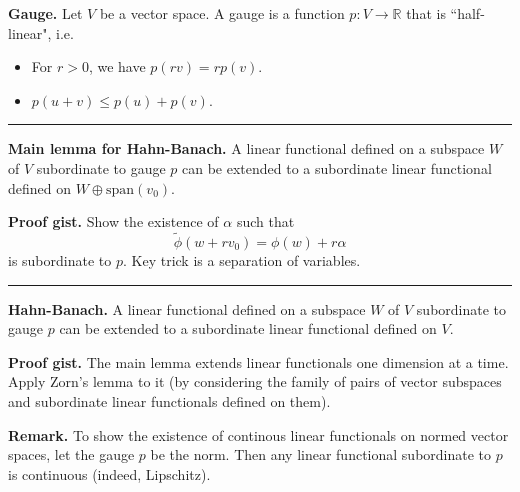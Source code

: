 \documentclass[12pt, letterpaper]{article}
\newcommand{\bR}{{\mathbb R}}
\begin{document}
\pagestyle{fancy}
\textbf{Gauge.} Let $V$ be a vector space. A gauge is a function $p: V \rightarrow \bR$ that is ``half-linear", i.e.
\begin{itemize}
\item
For $r > 0$, we have $p(rv) = rp(v)$.
\item
$p(u + v) \leq p(u) + p(v)$.
\end{itemize}

\noindent\rule{\textwidth}{1pt}
\textbf{Main lemma for Hahn-Banach.} A linear functional defined on a subspace $W$ of $V$ subordinate to gauge $p$ can be extended to a subordinate linear functional defined on $W \oplus \text{span}(v_0)$.

\textbf{Proof gist.} Show the existence of $\alpha$ such that
\[
\tilde{\phi}(w + rv_0) = \phi(w) + r \alpha
\]
is subordinate to $p$. Key trick is a separation of variables.

\noindent\rule{\textwidth}{1pt}
\textbf{Hahn-Banach.} A linear functional defined on a subspace $W$ of $V$ subordinate to gauge $p$ can be extended to a subordinate linear functional defined on $V$.

\textbf{Proof gist.} The main lemma extends linear functionals one dimension at a time. Apply Zorn's lemma to it (by considering the family of pairs of vector subspaces and subordinate linear functionals defined on them).

\textbf{Remark.} To show the existence of continous linear functionals on normed vector spaces, let the gauge $p$ be the norm. Then any linear functional subordinate to $p$ is continuous (indeed, Lipschitz).
\end{document}
